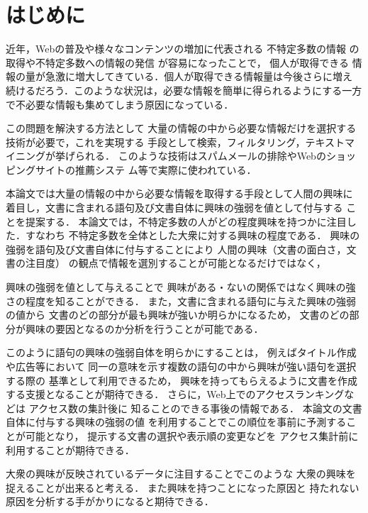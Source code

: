 \documentclass[japanese]{jnlp_1.4}
\begin{document}
\maketitle


\section{はじめに}

近年，Webの普及や様々なコンテンツの増加に代表される
不特定多数の情報
の取得や不特定多数への情報の発信
が容易になったことで，
個人が取得できる
情報の量が急激に増大してきている．個人が取得できる情報量は今後さらに増え
続けるだろう．このような状況は，必要な情報を簡単に得られるようにする一方
で不必要な情報も集めてしまう原因になっている．

この問題を解決する方法として
大量の情報の中から必要な情報だけを選択する技術が必要で，これを実現する
手段として検索，フィルタリング，テキストマイニングが挙げられる．
このような技術はスパムメールの排除やWebのショッピングサイトの推薦システ
ム等で実際に使われている．


本論文では大量の情報の中から必要な情報を取得する手段として人間の興味に
着目し，文書に含まれる語句及び文書自体に興味の強弱を値として付与する
ことを提案する．
本論文では，不特定多数の人がどの程度興味を持つかに注目した．すなわち
不特定多数を全体とした大衆に対する興味の程度である．
興味の強弱を語句及び文書自体に付与することにより
人間の興味（文書の面白さ，文書の注目度）
の観点で情報を選別することが可能となるだけではなく，


興味の強弱を値として与えることで
興味がある・ないの関係ではなく興味の強さの程度を知ることができる．
また，文書に含まれる語句に与えた興味の強弱の値から
文書のどの部分が最も興味が強いか明らかになるため，
文書のどの部分が興味の要因となるのか分析を行うことが可能である．

このように語句の興味の強弱自体を明らかにすることは，
例えばタイトル作成や広告等において
同一の意味を示す複数の語句の中から興味が強い語句を選択する際の
基準として利用できるため，
興味を持ってもらえるように文書を作成する支援となることが期待できる．
さらに，Web上でのアクセスランキングなどは
アクセス数の集計後に
知ることのできる事後の情報である．
本論文の文書自体に付与する興味の強弱の値
を利用することでこの順位を事前に予測することが可能となり，
提示する文書の選択や表示順の変更などを
アクセス集計前に利用することが期待できる．


大衆の興味が反映されているデータに注目することでこのような
大衆の興味を捉えることが出来ると考える．
また興味を持つことになった原因と
持たれない原因を分析する手がかりになると期待できる．
\end{document}

